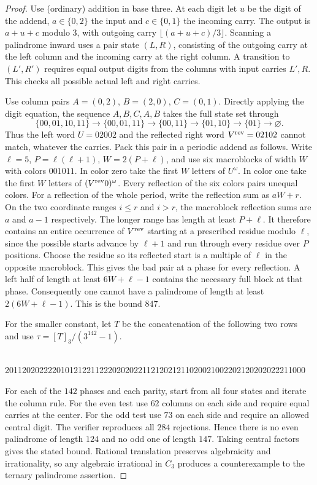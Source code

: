 \begin{proof}
Use (ordinary) addition in base three. At each digit let $u$ be the digit of the addend, $a\in\{0,2\}$ the input and $c\in\{0,1\}$ the incoming carry. The output is $a+u+c$ modulo $3$, with outgoing carry $\lfloor(a+u+c)/3\rfloor$. Scanning a palindrome inward uses a pair state $(L,R)$, consisting of the outgoing carry at the left column and the incoming carry at the right column. A transition to $(L',R')$ requires equal output digits from the columns with input carries $L',R$. This checks all possible actual left and right carries.

Use column pairs $A=(0,2)$, $B=(2,0)$, $C=(0,1)$. Directly applying the digit equation, the sequence $A,B,C,A,B$ takes the full state set through
\[
 \{00,01,10,11\}\longrightarrow\{00,01,11\}
 \longrightarrow\{00,11\}\longrightarrow\{01,10\}
 \longrightarrow\{01\}\longrightarrow\varnothing .
\]
Thus the left word $U=02002$ and the reflected right word $V^{\rm rev}=02102$ cannot match, whatever the carries. Pack this pair in a periodic addend as follows. Write $\ell=5$, $P=\ell(\ell+1)$, $W=2(P+\ell)$, and use six macroblocks of width $W$ with colors $001011$. In color zero take the first $W$ letters of $U^\omega$. In color one take the first $W$ letters of $(V^{\rm rev}0)^\omega$. Every reflection of the six colors pairs unequal colors. For a reflection of the whole period, write the reflection sum as $aW+r$. On the two coordinate ranges $i\le r$ and $i>r$, the macroblock reflection sums are $a$ and $a-1$ respectively. The longer range has length at least $P+\ell$. It therefore contains an entire occurrence of $V^{\rm rev}$ starting at a prescribed residue modulo $\ell$, since the possible starts advance by $\ell+1$ and run through every residue over $P$ positions. Choose the residue so its reflected start is a multiple of $\ell$ in the opposite macroblock. This gives the bad pair at a phase for every reflection. A left half of length at least $6W+\ell-1$ contains the necessary full block at that phase. Consequently one cannot have a palindrome of length at least $2(6W+\ell-1)$. This is the bound $847$.

For the smaller constant, let $T$ be the concatenation of the following two rows and use $\tau=[T]_3/(3^{142}-1)$.
\begin{center}
\footnotesize{}\\
2011202022220101212211222020202211212021211020021002202120202022211000
\end{center}
For each of the $142$ phases and each parity, start from all four states and iterate the column rule. For the even test use $62$ columns on each side and require equal carries at the center. For the odd test use $73$ on each side and require an allowed central digit. The verifier reproduces all $284$ rejections. Hence there is no even palindrome of length $124$ and no odd one of length $147$. Taking central factors gives the stated bound. Rational translation preserves algebraicity and irrationality, so any algebraic irrational in $C_3$ produces a counterexample to the ternary palindrome assertion.
\end{proof}

